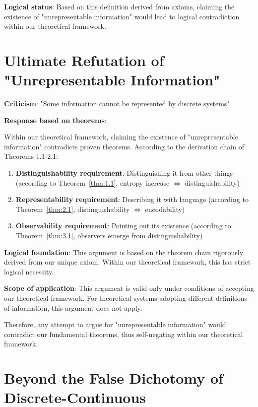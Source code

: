 \textbf{Logical status}: Based on this definition derived from axioms, claiming the existence of "unrepresentable information" would lead to logical contradiction within our theoretical framework.

\section{Ultimate Refutation of "Unrepresentable Information"}
\label{sec:ch07_defense:ultimate-refutation-of-unrepresentable-information}

\textbf{Criticism}: "Some information cannot be represented by discrete systems"

\textbf{Response based on theorems}:

Within our theoretical framework, claiming the existence of "unrepresentable information" contradicts proven theorems. According to the derivation chain of Theorems 1.1-2.1:

\begin{enumerate}
\item \textbf{Distinguishability requirement}: Distinguishing it from other things (according to Theorem~\ref{thm:1.1}, entropy increase $\Leftrightarrow$ distinguishability)
\item \textbf{Representability requirement}: Describing it with language (according to Theorem~\ref{thm:2.1}, distinguishability $\Leftrightarrow$ encodability)
\item \textbf{Observability requirement}: Pointing out its existence (according to Theorem~\ref{thm:3.1}, observers emerge from distinguishability)
\end{enumerate}

\textbf{Logical foundation}: This argument is based on the theorem chain rigorously derived from our unique axiom. Within our theoretical framework, this has strict logical necessity.

\textbf{Scope of application}: This argument is valid only under conditions of accepting our theoretical framework. For theoretical systems adopting different definitions of information, this argument does not apply.

Therefore, any attempt to argue for "unrepresentable information" would contradict our fundamental theorems, thus self-negating within our theoretical framework.

\section{Beyond the False Dichotomy of Discrete-Continuous}
\label{sec:ch07_defense:beyond-the-false-dichotomy-of-discrete-continuous}

